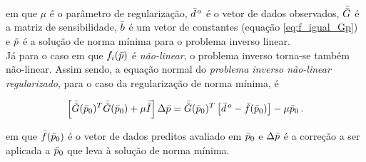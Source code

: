 \noindent em que $\mu$ é o parâmetro de regularização, $\bar{d}^{\thinspace o}$
é o vetor de dados observados, $\bar{\bar{G}}$ é a matriz de sensibilidade, $\bar{b}$
é um vetor de constantes (equação \ref{eq:f_igual_Gp}) e $\tilde{p}$ é a solução
de norma mínima para o problema inverso linear.
\\
\indent Já para o caso em que $f_i(\bar{p})$ é {\it não-linear}, o problema
inverso torna-se também não-linear. Assim sendo, a equação normal do
{\it problema inverso não-linear regularizado}, para o caso da regularização de
norma mínima, é

\begin{equation}
\left[\bar{\bar{G}}(\bar{p}_0)^T\bar{\bar{G}}(\bar{p}_0) +
      \mu\bar{\bar{I}}\right]\Delta\bar{p} =
\bar{\bar{G}}(\bar{p}_0)^T \left[\bar{d}^{\thinspace o} - \bar{f}(\bar{p}_0)\right] -
\mu\bar{p}_0
    \thinspace .
\label{eq:sistema_normal_norma_min_naolinear}
\end{equation}

\noindent em que $\bar{f}(\bar{p}_0)$ é o vetor de dados preditos avaliado em
$\bar{p}_0$ e $\Delta\bar{p}$ é a correção a ser aplicada a $\bar{p}_0$
que leva à solução de norma mínima.
